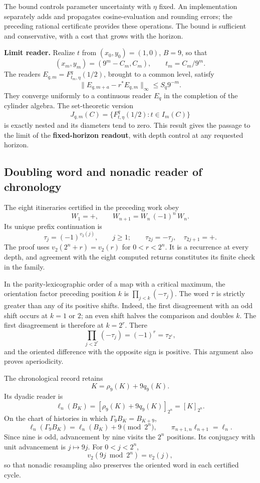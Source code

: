 The bound controls parameter uncertainty with \(\eta\) fixed. An implementation separately adds and propagates cosine-evaluation and rounding errors; the preceding rational certificate provides these operations. The bound is sufficient and conservative, with a cost that grows with the horizon.

\textbf{Limit reader.} Realize \(t\) from \((x_0,y_0)=(1,0)\), \(B=9\), so that
\[
(x_m,y_m)=(9^m-C_m,C_m),\qquad t_m=C_m/9^m.
\]
The readers \(E_{q,m}=F_{t_m,\eta}^{q}(1/2)\), brought to a common level, satisfy
\[
\|E_{q,m+a}-r^*E_{q,m}\|_\infty\le S_q9^{-m}.
\]
They converge uniformly to a continuous reader \(E_q\) in the completion of the cylinder algebra. The set-theoretic version
\[
J_{q,m}(C)=\{F_{t,\eta}^{q}(1/2):t\in I_m(C)\}
\]
is exactly nested and its diameters tend to zero. This result gives the passage to the limit of the \textbf{fixed-horizon readout}, with depth control at any requested horizon.


\subsection{Doubling word and nonadic reader of chronology}
\label{hmtfg:prolongacion:4}

The eight itineraries certified in the preceding work obey
\[
W_1=+,\qquad W_{n+1}=W_n\,(-1)^n\,W_n.
\]
Its unique prefix continuation is
\[
\tau_j=(-1)^{v_2(j)},\qquad j\ge1;
\qquad \tau_{2j}=-\tau_j,\quad\tau_{2j+1}=+.
\]
The proof uses \(v_2(2^n+r)=v_2(r)\) for \(0<r<2^n\). It is a recurrence at every depth, and agreement with the eight computed returns constitutes its finite check in the family.

In the parity-lexicographic order of a map with a critical maximum, the orientation factor preceding position \(k\) is \(\prod_{j<k}(-\tau_j)\). The word \(\tau\) is strictly greater than any of its positive shifts. Indeed, the first disagreement with an odd shift occurs at \(k=1\) or \(2\); an even shift halves the comparison and doubles \(k\). The first disagreement is therefore at \(k=2^r\). There
\[
\prod_{j<2^r}(-\tau_j)=(-1)^r=\tau_{2^r},
\]
and the oriented difference with the opposite sign is positive. This argument also proves aperiodicity.

The chronological record retains
\[
K=\rho_9(K)+9q_9(K).
\]
Its dyadic reader is
\[
\ell_n(B_K)=[\rho_9(K)+9q_9(K)]_{2^n}=[K]_{2^n}.
\]
On the chart of histories in which \(\Gamma_9 B_K=B_{K+9}\),
\[
\ell_n(\Gamma_9B_K)=\ell_n(B_K)+9\pmod{2^n},\qquad
\pi_{n+1,n}\ell_{n+1}=\ell_n.
\]
Since nine is odd, advancement by nine visits the \(2^n\) positions. Its conjugacy with unit advancement is \(j\mapsto9j\). For \(0<j<2^n\),
\[
v_2(9j\bmod2^n)=v_2(j),
\]
so that nonadic resampling also preserves the oriented word in each certified cycle.

